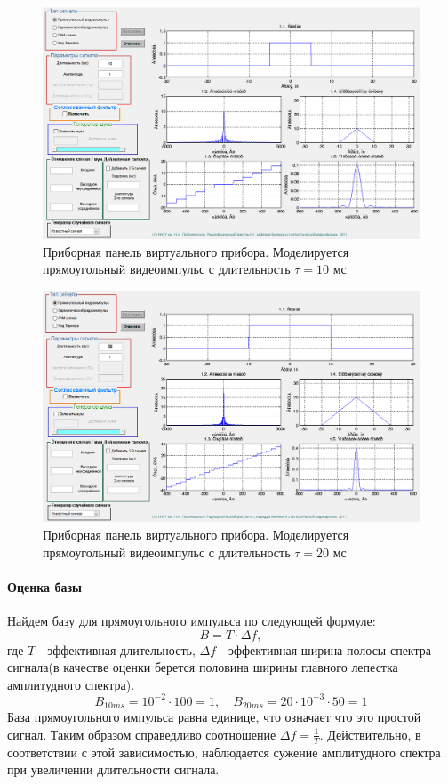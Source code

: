 \begin{figure}[H]
    \centering
    \includegraphics[width=0.9\linewidth]{imgs/t1s1_10.png}
    \caption{Приборная панель виртуального прибора. Моделируется
    прямоугольный видеоимпульс с длительность $\tau=10$ мс}
    \label{fig:task1_10}
\end{figure}
\begin{figure}[H]
    \centering
    \includegraphics[width=0.9\linewidth]{imgs/t1s1_20.png}
    \caption{Приборная панель виртуального прибора. Моделируется
    прямоугольный видеоимпульс с длительность $\tau=20$ мс}
    \label{fig:task1_20}
\end{figure}


\paragraph{Оценка базы}%
\label{par:otsenka_bazy}


Найдем базу для прямоугольного импульса по следующей формуле: 
\begin{equation}
    B = T \cdot \Delta f,
    \label{eq:p:1}
\end{equation}
где $T$ - эффективная длительность, $\Delta f$ - эффективная ширина полосы спектра
сигнала(в качестве оценки берется половина ширины главного лепестка амплитудного спектра).
\begin{equation}
    B_{10ms} = 10^{-2} \cdot 100 = 1, \quad B_{20ms} = 20 \cdot 10^{-3} \cdot 50 = 1
    \label{eq:}
\end{equation}
База прямоугольного импульса равна единице, что означает что это простой сигнал. Таким образом
справедливо соотношение $\Delta f = \frac{1}{T}$. Действительно, в соответствии с этой зависимостью,
наблюдается сужение амплитудного спектра при увеличении длительности сигнала.

